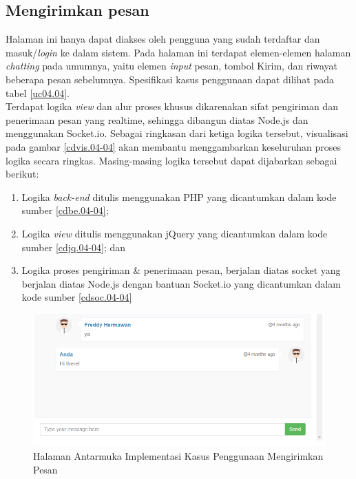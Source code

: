 \subsection{Mengirimkan pesan}
Halaman ini hanya dapat diakses oleh pengguna yang sudah terdaftar dan masuk/\textit{login} ke dalam sistem. Pada halaman ini terdapat elemen-elemen halaman \textit{chatting} pada umumnya, yaitu elemen \textit{input} pesan, tombol Kirim, dan riwayat beberapa pesan sebelumnya. Spesifikasi kasus penggunaan dapat dilihat pada tabel \ref{uc04.04}.\\
\indent Terdapat logika \textit{view} dan alur proses khusus dikarenakan sifat pengiriman dan penerimaan pesan yang realtime, sehingga dibangun diatas Node.js dan menggunakan Socket.io. Sebagai ringkasan dari ketiga logika tersebut, visualisasi pada gambar \ref{cdvis.04-04} akan membantu menggambarkan keseluruhan proses logika secara ringkas. Masing-masing logika tersebut dapat dijabarkan sebagai berikut:
	\begin{enumerate}
		\item Logika \textit{back-end} ditulis menggunakan PHP yang dicantumkan dalam kode sumber \ref{cdbe.04-04}; 
		\item Logika \textit{view} ditulis menggunakan jQuery yang dicantumkan dalam kode sumber \ref{cdjq.04-04}; dan
		\item Logika proses pengiriman \& penerimaan pesan, berjalan diatas socket yang berjalan diatas Node.js dengan bantuan Socket.io yang dicantumkan dalam kode sumber \ref{cdsoc.04-04}
	\end{enumerate}

\begin{figure}[H]
\centering
\includegraphics[width=\textwidth]{images/bab4/ui/04-04.png}
\caption{Halaman Antarmuka Implementasi Kasus Penggunaan Mengirimkan Pesan}
\label{ui.04-04}
\end{figure}

